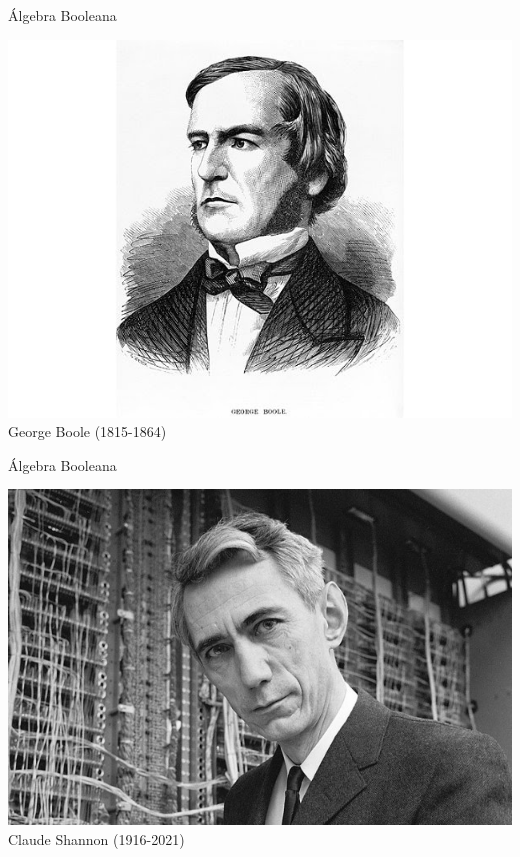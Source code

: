 \documentclass[10pt,xcolor={dvipsnames}]{beamer}
\begin{document}
\begin{frame}{Álgebra Booleana}
\begin{center}
\includegraphics[scale=0.35]{Figures/3George-Boole} \\
George Boole (1815-1864)
\end{center}
\end{frame}


\begin{frame}{Álgebra Booleana}
\begin{center}
\includegraphics[scale=0.4]{Figures/3Shannon} \\
Claude Shannon (1916-2021)
\end{center}
\end{frame}
\end{document}
